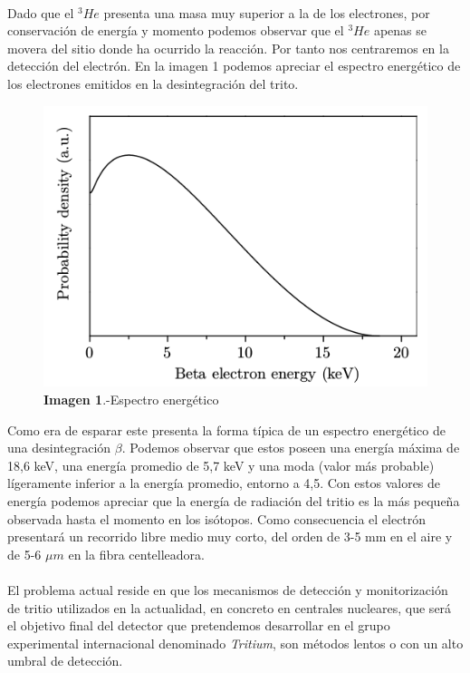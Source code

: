 \documentclass[11pt, a4paper]{article}
\begin{document}
\paragraph {}
Dado que el $^3He$ presenta una masa muy superior a la de los electrones, por conservación de energía y momento podemos observar que el $^3He$ apenas se movera del sitio donde ha ocurrido la reacción. Por tanto nos centraremos en la detección del electrón. En la imagen 1 podemos apreciar el espectro energético de los electrones emitidos en la desintegración del trito.

\begin{figure}[hbtp]
\includegraphics[scale=0.4]{Espectro.png}
\centering
\caption{\textbf{Imagen 1}.-Espectro energético}
\end{figure}

Como era de esparar este presenta la forma típica de un espectro energético de una desintegración $\beta$. Podemos observar que estos poseen una energía máxima de 18,6 keV, una energía promedio de 5,7 keV y una moda (valor más probable) lígeramente inferior a la energía promedio, entorno a 4,5. Con estos valores de energía podemos apreciar que la energía de radiación del tritio es la más pequeña observada hasta el momento en los isótopos. Como consecuencia el electrón presentará un recorrido libre medio muy corto, del orden de 3-5 mm en el aire y de 5-6 $\mu m$ en la fibra centelleadora.

\paragraph {}
El problema actual reside en que los mecanismos de detección y monitorización de tritio utilizados en la actualidad, en concreto en centrales nucleares, que será el objetivo final del detector que pretendemos desarrollar en el grupo experimental internacional denominado \textit{Tritium}, son métodos lentos o con un alto umbral de detección. 
\end{document}
